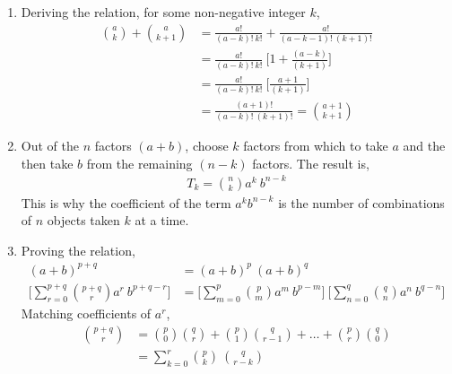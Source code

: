 \begin{enumerate}
\begin{enumerate}
              \item Deriving the relation, for some non-negative integer $ k $,
                    \begin{align}
                        \binom{a}{k} + \binom{a}{k+1}
                         & = \frac{a!}{(a-k)!\ k!}
                        + \frac{a!}{(a-k-1)!\ (k+1)!}                              \\
                         & =
                        \frac{a!}{(a-k)!\ k!}\ \Bigg[1 + \frac{(a-k)}{(k+1)}\Bigg] \\
                         & =
                        \frac{a!}{(a-k)!\ k!}\ \Bigg[\frac{a+1}{(k+1)}\Bigg]       \\
                         & = \frac{(a+1)!}{(a-k)!\ (k+1)!} = \binom{a+1}{k+1}
                    \end{align}

              \item Out of the $ n $ factors $ (a+b) $, choose $ k $ factors from
                    which to take $ a $ and the then take $ b $ from the remaining
                    $ (n-k) $ factors. The result is,
                    \begin{align}
                        T_k = \binom{n}{k} a^k\ b^{n-k}
                    \end{align}
                    This is why the coefficient of the term $ a^k b^{n-k} $ is the
                    number of combinations of $ n $ objects taken $ k $ at a time.

              \item Proving the relation,
                    \begin{align}
                        (a+b)^{p+q} & = (a+b)^p\ (a+b)^q \\
                        \Bigg[\sum_{r=0}^{p+q} \binom{p+q}{r} a^r\ b^{p+q-r}\Bigg]
                                    & =
                        \Bigg[\sum_{m=0}^{p} \binom{p}{m} a^m\ b^{p-m}\Bigg]
                        \ \Bigg[\sum_{n=0}^{q} \binom{q}{n} a^n\ b^{q-n}\Bigg]
                    \end{align}
                    Matching coefficients of $ a^r $,
                    \begin{align}
                        \binom{p+q}{r} & = \binom{p}{0} \binom{q}{r} +
                        \binom{p}{1} \binom{q}{r-1} + \dots + \binom{p}{r}
                        \binom{q}{0}                                                   \\
                                       & = \sum_{k=0}^{r} \binom{p}{k}\ \binom{q}{r-k}
                    \end{align}


\end{enumerate}
\end{enumerate}
